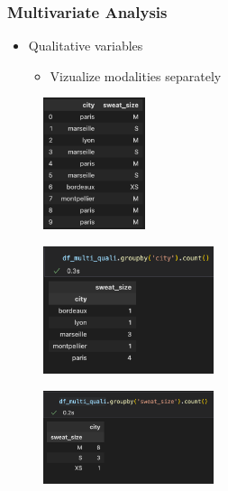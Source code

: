 \begin{frame}\frametitle{Multivariate Analysis}
   \begin{minipage}{0.48\linewidth}
      \begin{itemize}
         \item Qualitative variables
         \begin{itemize}
            \item Vizualize modalities separately
         \end{itemize}
      \end{itemize}
      \vspace{.5cm}
      \begin{figure}[H]
         \includegraphics[width=3cm]{../images/illustrations/pattern_multivariate_qualitative_df.png}
      \end{figure}
   \end{minipage}
   \begin{minipage}{0.48\linewidth}
      \begin{figure}[H]
         \includegraphics[width=5cm]{../images/illustrations/pattern_multivariate_qualitative_group_by_city_counts.png}
      \end{figure}
      \begin{figure}[H]
         \includegraphics[width=5cm]{../images/illustrations/pattern_multivariate_qualitative_group_by_sweat_size_counts.png}
      \end{figure}
   \end{minipage}
\end{frame}



